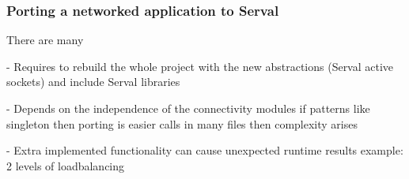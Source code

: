 \subsubsection{Porting a networked application to Serval}
There are many 

- Requires to rebuild the whole project with the new abstractions (Serval active sockets) and include Serval libraries

- Depends on the independence of the connectivity modules
if patterns like singleton then porting is easier
calls in many files then complexity arises

- Extra implemented functionality can cause unexpected runtime results
example: 2 levels of loadbalancing

